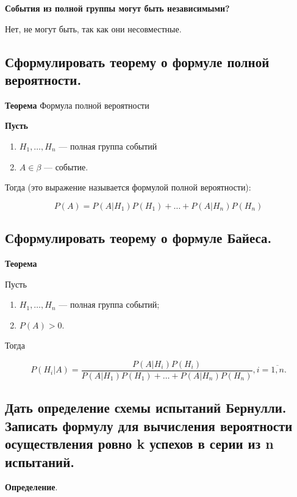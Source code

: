 \textbf{События из полной группы могут быть независимыми?}

Нет, не могут быть, так как они несовместные.

\subsection{Сформулировать теорему о формуле полной вероятности.}

\textbf{Теорема} Формула полной вероятности

\textbf{Пусть}

\begin{enumerate}
	\item $H_1, \dots, H_n$ --- полная группа событий
	\item $A \in \beta$ --- событие.
\end{enumerate}

Тогда (это выражение называется формулой полной вероятности):

\begin{equation}
	P(A) = P(A|H_1)P(H_1) + \dots + P(A|H_n)P(H_n)
\end{equation}

\subsection{Сформулировать теорему о формуле Байеса.}

\textbf{Теорема} 

Пусть

\begin{enumerate}
	\item $H_1, \dots, H_n$ --- полная группа событий;
	\item $P(A) > 0$.
\end{enumerate}

Тогда

\begin{equation}
	P(H_i|A) = \frac{P(A|H_i)P(H_i)}{P(A|H_1)P(H_1) + \dots + P(A|H_n)P(H_n)}, i = \overline{1, n}.
\end{equation}

\subsection{Дать определение схемы испытаний Бернулли. Записать формулу для вычисления вероятности осуществления ровно k успехов в серии из n испытаний.}

\textbf{Определение}. 


